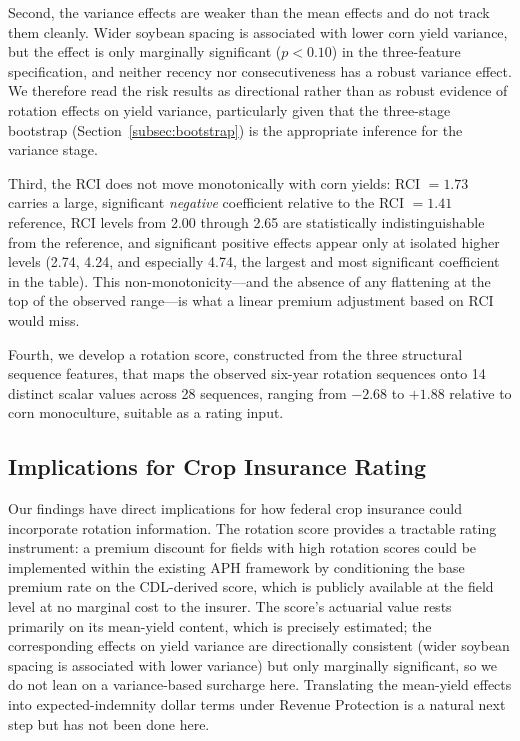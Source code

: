 \documentclass[12pt,letterpaper]{article}
\theoremstyle{remark}
\theoremstyle{remark}
\theoremstyle{plain}
\theoremstyle{definition}
\begin{document}
Second, the variance effects are weaker than the mean effects and do not track them cleanly. Wider soybean spacing is associated with lower corn yield variance, but the effect is only marginally significant ($p<0.10$) in the three-feature specification, and neither recency nor consecutiveness has a robust variance effect. We therefore read the risk results as directional rather than as robust evidence of rotation effects on yield variance, particularly given that the three-stage bootstrap (Section~\ref{subsec:bootstrap}) is the appropriate inference for the variance stage.
 
Third, the RCI does not move monotonically with corn yields: RCI $=1.73$ carries a large, significant \emph{negative} coefficient relative to the RCI $=1.41$ reference, RCI levels from 2.00 through 2.65 are statistically indistinguishable from the reference, and significant positive effects appear only at isolated higher levels (2.74, 4.24, and especially 4.74, the largest and most significant coefficient in the table). This non-monotonicity---and the absence of any flattening at the top of the observed range---is what a linear premium adjustment based on RCI would miss.
 
Fourth, we develop a rotation score, constructed from the three structural sequence features, that maps the observed six-year rotation sequences onto 14 distinct scalar values across 28 sequences, ranging from $-2.68$ to $+1.88$ relative to corn monoculture, suitable as a rating input.
 
\subsection{\label{subsec:implications}Implications for Crop Insurance Rating}
 
Our findings have direct implications for how federal crop insurance could incorporate rotation information. The rotation score provides a tractable rating instrument: a premium discount for fields with high rotation scores could be implemented within the existing APH framework by conditioning the base premium rate on the CDL-derived score, which is publicly available at the field level at no marginal cost to the insurer. The score's actuarial value rests primarily on its mean-yield content, which is precisely estimated; the corresponding effects on yield variance are directionally consistent (wider soybean spacing is associated with lower variance) but only marginally significant, so we do not lean on a variance-based surcharge here. Translating the mean-yield effects into expected-indemnity dollar terms under Revenue Protection is a natural next step but has not been done here.
 
\end{document}
